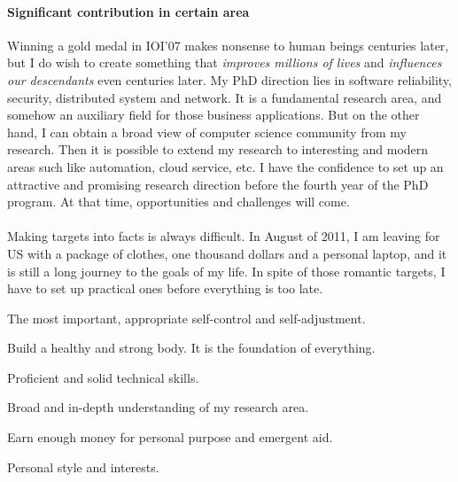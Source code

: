 \paragraph{Significant contribution in certain area}
Winning a gold medal in IOI'07 makes nonsense to human beings centuries later, but I do wish to create something that \emph{improves millions of lives} and \emph{influences our descendants} even centuries later. My PhD direction lies in software reliability, security, distributed system and network. It is a fundamental research area, and somehow an auxiliary field for those business applications. But on the other hand, I can obtain a broad view of computer science community from my research. Then it is possible to extend my research to interesting and modern areas such like automation, cloud service, etc. I have the confidence to set up an attractive and promising research direction before the fourth year of the PhD program. At that time, opportunities and challenges will come.

\vspace{0.3in}

\paragraph{} Making targets into facts is always difficult. In August of 2011, I am leaving for US with a package of clothes, one thousand dollars and a personal laptop, and it is still a long journey to the goals of my life. In spite of those romantic targets, I have to set up practical ones before everything is too late.

\begin{itemize*} 
\item The most important, appropriate self-control and self-adjustment.
\item Build a healthy and strong body. It is the foundation of everything.
\item Proficient and solid technical skills.
\item Broad and in-depth understanding of my research area.
\item Earn enough money for personal purpose and emergent aid. 
\item Personal style and interests.
\end{itemize*}

